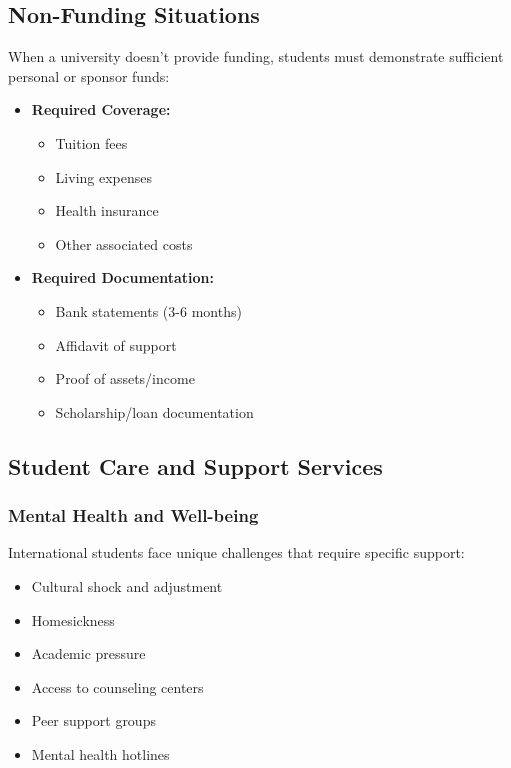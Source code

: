 \subsection{Non-Funding Situations}
When a university doesn't provide funding, students must demonstrate sufficient personal or sponsor funds:

\begin{itemize}
    \item \textbf{Required Coverage:}
    \begin{itemize}
        \item Tuition fees
        \item Living expenses
        \item Health insurance
        \item Other associated costs
    \end{itemize}
    
    \item \textbf{Required Documentation:}
    \begin{itemize}
        \item Bank statements (3-6 months)
        \item Affidavit of support
        \item Proof of assets/income
        \item Scholarship/loan documentation
    \end{itemize}
\end{itemize}

\subsection{Student Care and Support Services}
\subsubsection{Mental Health and Well-being}
International students face unique challenges that require specific support:
\begin{itemize}
    \item Cultural shock and adjustment
    \item Homesickness
    \item Academic pressure
    \item Access to counseling centers
    \item Peer support groups
    \item Mental health hotlines
\end{itemize}

